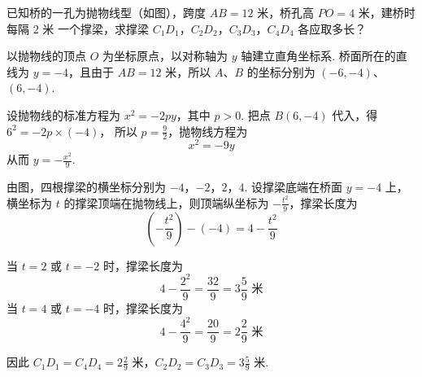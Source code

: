 \begin{problem}
已知桥的一孔为抛物线型（如图），跨度 \(AB=12\text{ 米}\)，桥孔高 \(PO=4\text{ 米}\)，建桥时每隔 \(2\text{ 米}\) 一个撑梁，求撑梁 \(C_1D_1\)，\(C_2D_2\)，\(C_3D_3\)，\(C_4D_4\) 各应取多长？

\end{problem}

\begin{solution}
以抛物线的顶点 \(O\) 为坐标原点，以对称轴为 \(y\) 轴建立直角坐标系. 桥面所在的直线为 \(y=-4\)，且由于 \(AB=12\text{ 米}\)，所以 \(A\)、\(B\) 的坐标分别为 \((-6,-4)\)、\((6,-4)\).

设抛物线的标准方程为 \(x^2=-2py\)，其中 \(p>0\). 把点 \(B(6,-4)\) 代入，得 \(6^2=-2p\times(-4)\)，
所以 \(p=\frac{9}{2}\)，抛物线方程为
\[
x^2=-9y
\]
从而 \(y=-\frac{x^2}{9}\).

由图，四根撑梁的横坐标分别为 \(-4\)，\(-2\)，\(2\)，\(4\). 设撑梁底端在桥面 \(y=-4\) 上，横坐标为 \(t\) 的撑梁顶端在抛物线上，则顶端纵坐标为 \(-\frac{t^2}{9}\)，撑梁长度为
\[
\left(-\frac{t^2}{9}\right)-(-4)=4-\frac{t^2}{9}
\]

当 \(t=2\) 或 \(t=-2\) 时，撑梁长度为
\[
4-\frac{2^2}{9}=\frac{32}{9}=3\frac{5}{9}\text{ 米}
\]
当 \(t=4\) 或 \(t=-4\) 时，撑梁长度为
\[
4-\frac{4^2}{9}=\frac{20}{9}=2\frac{2}{9}\text{ 米}
\]

因此 \(C_1D_1=C_4D_4=2\frac{2}{9}\text{ 米}\)，\(C_2D_2=C_3D_3=3\frac{5}{9}\text{ 米}\).
\end{solution}
